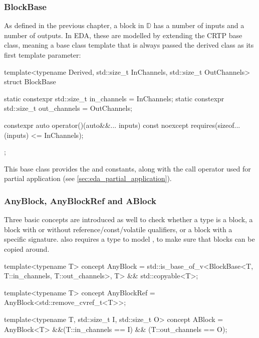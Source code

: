 \subsubsection{BlockBase}

As defined in the previous chapter, a block in $\mathbb D$ has a number of inputs and a number of
outputs. In EDA, these are modelled by extending the  CRTP\footnotemark{} base class, meaning a base class
template that is always passed the derived class as its first template parameter:


\newpage
\begin{cppcodenl}
  template<typename Derived, std::size_t InChannels, std::size_t OutChannels>
  struct BlockBase {
    static constexpr std::size_t in_channels = InChannels;
    static constexpr std::size_t out_channels = OutChannels;

    constexpr auto operator()(auto&&... inputs) const noexcept
    requires(sizeof...(inputs) <= InChannels);
  };
\end{cppcodenl}

This base class provides the  and  constants, along with the call operator used
for partial application (see \autoref{sec:eda_partial_application}).

\subsubsection{AnyBlock, AnyBlockRef and ABlock}

Three basic concepts are introduced as well to check whether a type  is a block, a
block with or without reference/const/volatile qualifiers, or a block with a specific signature.
 also requires a type to model \footnotemark, to make sure that
blocks can be copied around.


\begin{cppcodenl}
  template<typename T>
  concept AnyBlock = std::is_base_of_v<BlockBase<T, T::in_channels, T::out_channels>, T> && std::copyable<T>;

  template<typename T>
  concept AnyBlockRef = AnyBlock<std::remove_cvref_t<T>>;

  template<typename T, std::size_t I, std::size_t O>
  concept ABlock = AnyBlock<T> &&(T::in_channels == I) && (T::out_channels == O);
\end{cppcodenl}

